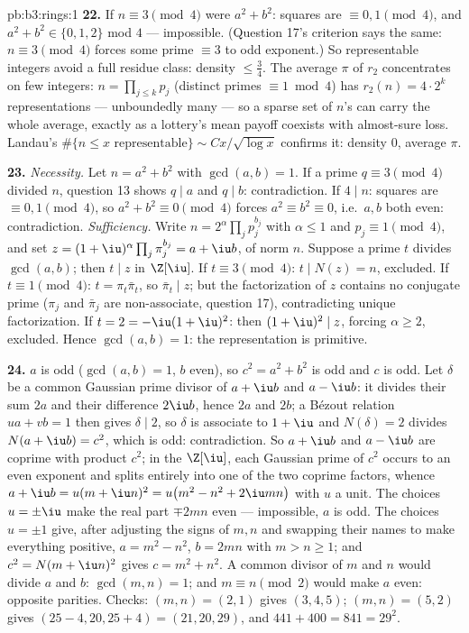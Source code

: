 \begin{solution}{pb:b3:rings:1}
\textbf{22.} If $n \equiv 3 \pmod4$ were $a^2 + b^2$: squares
are $\equiv 0, 1 \pmod 4$, and $a^2 + b^2 \in \{0, 1, 2\}$
mod $4$ --- impossible. (Question 17's criterion says the
same: $n \equiv 3 \pmod 4$ forces some prime $\equiv 3$ to odd
exponent.) So representable integers avoid a full residue
class: density $\leq \frac34$. The average $\pi$ of $r_2$
concentrates on few integers: $n = \prod_{j\leq k}p_j$
(distinct primes $\equiv 1 \bmod 4$) has $r_2(n) = 4\cdot2^k$
representations --- unboundedly many --- so a sparse set of
$n$'s can carry the whole average, exactly as a lottery's mean
payoff coexists with almost-sure loss. Landau's
$\#\{n \leq x \text{ representable}\} \sim
Cx/\sqrt{\log x}$ confirms it: density $0$, average $\pi$.

\textbf{23.} \emph{Necessity.} Let $n = a^2 + b^2$ with
$\gcd(a, b) = 1$. If a prime $q \equiv 3 \pmod 4$ divided $n$,
question 13 shows $q \mid a$ and $q \mid b$: contradiction. If
$4 \mid n$: squares are $\equiv 0, 1 \pmod 4$, so $a^2 + b^2
\equiv 0 \pmod 4$ forces $a^2 \equiv b^2 \equiv 0$, i.e.\ $a,
b$ both even: contradiction. \emph{Sufficiency.} Write $n =
2^{\alpha}\prod_jp_j^{b_j}$ with $\alpha \leq 1$ and $p_j
\equiv 1 \pmod 4$, and set $z = (1+\iu)^{\alpha}\prod_j
\pi_j^{b_j} = a + \iu b$, of norm $n$. Suppose a prime $t$
divides $\gcd(a, b)$; then $t \mid z$ in $\Z[\iu]$. If $t
\equiv 3 \pmod 4$: $t \mid N(z) = n$, excluded. If $t \equiv 1
\pmod 4$: $t = \pi_t\bar\pi_t$, so $\bar\pi_t \mid z$; but the
factorization of $z$ contains no conjugate prime ($\pi_j$ and
$\bar\pi_j$ are non-associate, question 17), contradicting
unique factorization. If $t = 2 = -\iu(1+\iu)^2$: then
$(1+\iu)^2 \mid z$, forcing $\alpha \geq 2$, excluded. Hence
$\gcd(a, b) = 1$: the representation is primitive.

\textbf{24.} $a$ is odd ($\gcd(a, b) = 1$, $b$ even), so $c^2
= a^2 + b^2$ is odd and $c$ is odd. Let $\delta$ be a common
Gaussian prime divisor of $a + \iu b$ and $a - \iu b$: it
divides their sum $2a$ and their difference $2\iu b$, hence
$2a$ and $2b$; a B\'ezout relation $ua + vb = 1$ then gives
$\delta \mid 2$, so $\delta$ is associate to $1 + \iu$ and
$N(\delta) = 2$ divides $N(a + \iu b) = c^2$, which is odd:
contradiction. So $a + \iu b$ and $a - \iu b$ are coprime with
product $c^2$; in the  $\Z[\iu]$, each Gaussian prime of
$c^2$ occurs to an even exponent and splits entirely into one
of the two coprime factors, whence $a + \iu b = u(m + \iu
n)^2 = u\bigl(m^2 - n^2 + 2\iu mn\bigr)$ with $u$ a unit. The
choices $u = \pm\iu$ make the real part $\mp 2mn$ even ---
impossible, $a$ is odd. The choices $u = \pm1$ give, after
adjusting the signs of $m, n$ and swapping their names to make
everything positive, $a = m^2 - n^2$, $b = 2mn$ with $m > n
\geq 1$; and $c^2 = N(m + \iu n)^2$ gives $c = m^2 + n^2$. A
common divisor of $m$ and $n$ would divide $a$ and $b$: $\gcd
(m, n) = 1$; and $m \equiv n \pmod 2$ would make $a$ even:
opposite parities. Checks: $(m, n) = (2, 1)$ gives $(3, 4,
5)$; $(m, n) = (5, 2)$ gives $(25 - 4, 20, 25 + 4) = (21, 20,
29)$, and $441 + 400 = 841 = 29^2$.


\end{solution}
